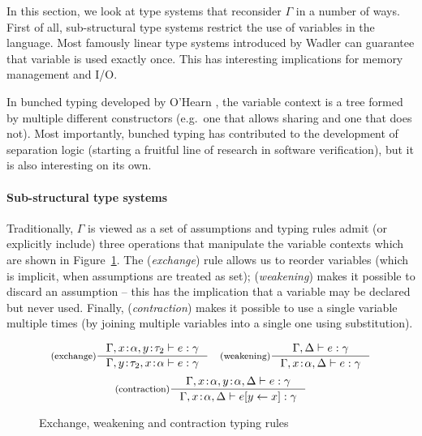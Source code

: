 In this section, we look at type systems that reconsider $\Gamma$ in a number of ways. 
First of all, sub-structural type systems \cite{substruct-attpl-intro} restrict the use of variables
in the language. Most famously linear type systems introduced by Wadler \cite{substruct-linear-change} 
can guarantee that variable is used exactly once. This has interesting implications for memory
management and I/O. 

In bunched typing developed by O'Hearn \cite{substruct-bunched}, the variable context is a tree 
formed by multiple different constructors (e.g.~one that allows sharing and one that does not). 
Most importantly, bunched typing has contributed to the development of separation logic
\cite{substruct-separation-logic} (starting a fruitful line of research in software verification), 
but it is also interesting on its own. 


\paragraph{Sub-structural type systems}

Traditionally, $\Gamma$ is viewed as a set of assumptions and typing rules admit (or explicitly
include) three operations that manipulate the variable contexts which are shown in 
Figure~\ref{fig:substructural-rules}. The (\emph{exchange}) rule allows us to reorder variables
(which is implicit, when assumptions are treated as set); (\emph{weakening}) makes it possible
to discard an assumption -- this has the implication that a variable may be declared but never
used. Finally, (\emph{contraction}) makes it possible to use a single variable multiple times
(by joining multiple variables into a single one using substitution).

\begin{figure}
\begin{equation*}
\inference[(exchange)]
  {\Gamma, x\!:\!\alpha, y\!:\!\tau_2 \vdash e : \gamma}
  {\Gamma, y\!:\!\tau_2, x\!:\!\alpha \vdash e : \gamma}
\quad
\inference[(weakening)]
  {\Gamma, \Delta \vdash e : \gamma}
  {\Gamma, x\!:\!\alpha, \Delta \vdash e : \gamma}
\end{equation*}
\begin{equation*}
\inference[(contraction)]
  {\Gamma, x\!:\!\alpha, y\!:\!\alpha, \Delta \vdash e : \gamma}
  {\Gamma, x\!:\!\alpha, \Delta \vdash \subst{e}{y}{x} : \gamma}
\end{equation*}

\caption{Exchange, weakening and contraction typing rules}
\label{fig:substructural-rules}
\end{figure}

